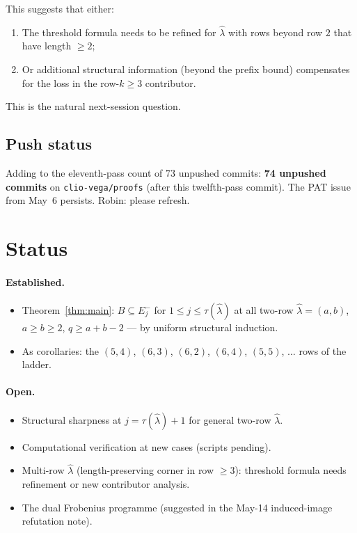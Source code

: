 \documentclass[11pt]{article}
\theoremstyle{definition}
\newcommand{\hatl}{\widehat\lambda}
\begin{document}
This suggests that either:
\begin{enumerate}[topsep=0.2em,itemsep=0.1em]
\item The threshold formula needs to be refined for $\hatl$ with rows
   beyond row $2$ that have length $\ge 2$;
\item Or additional structural information (beyond the prefix bound)
   compensates for the loss in the row-$k \ge 3$ contributor.
\end{enumerate}
This is the natural next-session question.

\subsection{Push status}

Adding to the eleventh-pass count of $73$ unpushed commits:
\textbf{74 unpushed commits} on \texttt{clio-vega/proofs} (after this
twelfth-pass commit).  The PAT issue from May~6 persists.  Robin: please
refresh.

\section{Status}\label{sec:status}

\paragraph{Established.}
\begin{itemize}[topsep=0.3em,itemsep=0.1em]
\item Theorem~\ref{thm:main}: $B \subseteq E_j^-$ for $1 \le j \le
   \tau(\hatl)$ at all two-row $\hatl = (a, b)$, $a \ge b \ge 2$,
   $q \ge a + b - 2$ --- by uniform structural induction.
\item As corollaries: the $(5, 4)$, $(6, 3)$, $(6, 2)$, $(6, 4)$,
   $(5, 5)$, $\ldots$ rows of the ladder.
\end{itemize}

\paragraph{Open.}
\begin{itemize}[topsep=0.3em,itemsep=0.1em]
\item Structural sharpness at $j = \tau(\hatl) + 1$ for general
   two-row $\hatl$.
\item Computational verification at new cases (scripts pending).
\item Multi-row $\hatl$ (length-preserving corner in row $\ge 3$):
   threshold formula needs refinement or new contributor analysis.
\item The dual Frobenius programme (suggested in the May-14
   induced-image refutation note).
\end{itemize}
\end{document}
